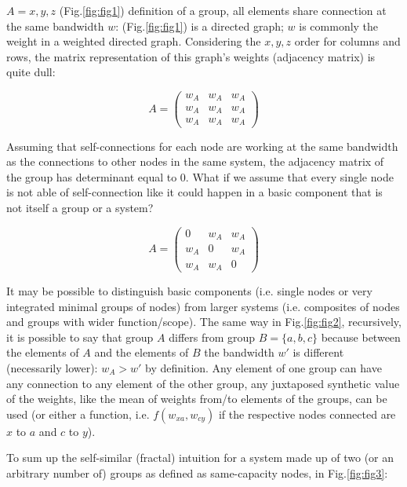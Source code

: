 \documentclass[14pt,a4paper]{extarticle}
\begin{document}
\(A = { x, y, z }\) (Fig.\ref{fig:fig1})
definition of a group, all elements share connection at the same bandwidth \(w\): (Fig.\ref{fig:fig1}) is a directed graph; \(w\) is commonly the weight in a weighted directed graph. Considering the \(x, y, z\) order for columns and rows, the matrix representation of this graph's weights (adjacency matrix) is quite dull:

\[%
A = \begin{pmatrix}%
w_A&w_A&w_A\\%
w_A&w_A&w_A\\%
w_A&w_A&w_A%
\end{pmatrix}%
\]

Assuming that self-connections for each node are working at the same bandwidth as the connections to other nodes in the same system, the adjacency matrix of the group has determinant equal to 0. What if we assume that every single node is not able of self-connection like it could happen in a basic component that is not itself a group or a system?

\[%
A = \begin{pmatrix}%
0&w_A&w_A\\%
w_A&0&w_A\\%
w_A&w_A&0%
\end{pmatrix}%
\]

It may be possible to distinguish basic components (i.e. single nodes or very integrated minimal groups of nodes) from larger systems (i.e. composites of nodes and groups with wider function/scope).
\newline
\hspace*{15mm}The same way in Fig.\ref{fig:fig2}, recursively, it is possible to say that group \(A\) differs from group \(B = \{a, b, c\}\) because between the elements of \(A\) and the elements of \(B\) the bandwidth \(w'\) is different (necessarily lower): \(w_A > w'\) by definition. Any element of one group can have any connection to any element of the other group, any juxtaposed synthetic value of the weights, like the mean of weights from/to elements of the groups, can be used (or either a function, i.e. \(f(w_{xa}, w_{cy})\) if the respective nodes connected are \(x\) to \(a\) and \(c\) to \(y\)).

To sum up the self-similar (fractal) intuition for a system made up of two (or an arbitrary number of) groups as defined as same-capacity nodes, in Fig.\ref{fig:fig3}:
\end{document}
